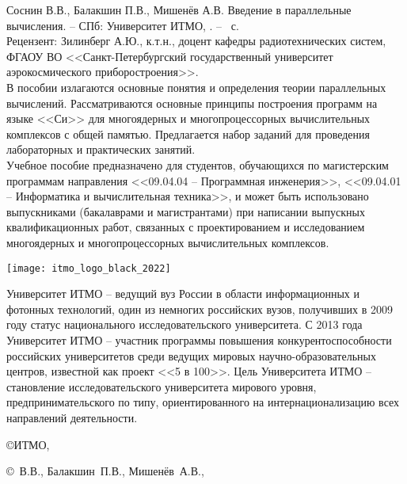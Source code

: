 \thispagestyle{empty}
 
Соснин В.В., Балакшин П.В., Мишенёв А.В. Введение в параллельные вычисления. -- СПб: Университет ИТМО, \the\year. -- \pageref{LastPage}~с. \\

Рецензент: Зилинберг А.Ю., к.т.н., доцент кафедры радиотехнических систем, ФГАОУ ВО <<Санкт-Петербургский государственный университет аэрокосмического приборостроения>>. \\

В пособии излагаются основные понятия и определения теории параллельных вычислений. Рассматриваются основные принципы построения программ на языке <<Си>> для многоядерных и многопроцессорных вычислительных комплексов с общей памятью. Предлагается набор заданий для проведения лабораторных и практических занятий. \\

Учебное пособие предназначено для студентов, обучающихся по магистерским программам направления <<09.04.04 -- Программная инженерия>>, <<09.04.01 -- Информатика и вычислительная техника>>, и может быть использовано выпускниками (бакалаврами и магистрантами) при написании выпускных квалификационных работ, связанных с проектированием и исследованием многоядерных и многопроцессорных вычислительных комплексов.

\vspace*{\fill}

\begin{flushright}
    \texttt{[image: itmo\_logo\_black\_2022]}
\end{flushright}

Университет ИТМО – ведущий вуз России в области информационных и фотонных технологий, один из немногих российских вузов, получивших в 2009 году статус национального исследовательского университета. С 2013 года Университет ИТМО -- участник программы повышения конкурентоспособности российских университетов среди ведущих мировых научно-образовательных центров, известной как проект <<5 в 100>>. Цель Университета ИТМО -- становление исследовательского университета мирового уровня, предпринимательского по типу, ориентированного на интернационализацию всех направлений деятельности.
\begin{flushright}
    \copyright{} ИТМО, \the\year
    
    \copyright{}~В.В., Балакшин~П.В., Мишенёв~А.В., \the\year
\end{flushright}
